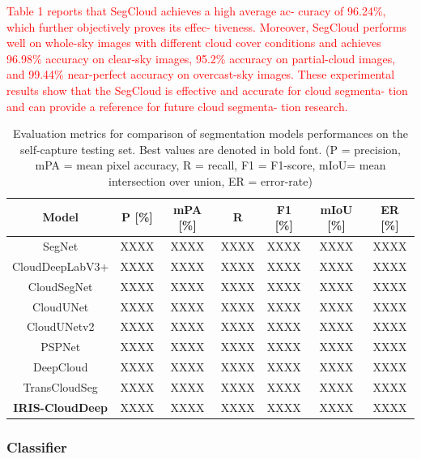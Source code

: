 \documentclass[amt, article]{copernicus}
\begin{document}
\textcolor{red}{Table 1 reports that SegCloud achieves a high average ac-
curacy of 96.24\%, which further objectively proves its effec-
tiveness. Moreover, SegCloud performs well on whole-sky
images with different cloud cover conditions and achieves
96.98\% accuracy on clear-sky images, 95.2\% accuracy on
partial-cloud images, and 99.44\% near-perfect accuracy on overcast-sky images. These experimental results show that
the SegCloud is effective and accurate for cloud segmenta-
tion and can provide a reference for future cloud segmenta-
tion research.}

\begin{table}[t]
\begin{center}
    \caption{Evaluation metrics for comparison of segmentation models performances on the self-capture testing set. Best values are denoted in bold font. (P = precision, mPA = mean pixel accuracy, R = recall, F1 = F1-score, mIoU= mean intersection over union, ER = error-rate)}
    \begin{tabular}{c c c c c c c} 
    \tophline \hline
     Model & P [\%] & mPA [\%] & R & F1 [\%] & mIoU [\%] & ER [\%] \\ [1.0ex]
     \hline
     SegNet & XXXX & XXXX & XXXX & XXXX & XXXX & XXXX \\ [1.0ex]
     CloudDeepLabV3+ & XXXX & XXXX & XXXX & XXXX & XXXX & XXXX \\ [1.0ex]
     CloudSegNet & XXXX & XXXX & XXXX & XXXX & XXXX & XXXX \\ [1.0ex]
     CloudUNet & XXXX & XXXX & XXXX & XXXX & XXXX & XXXX \\ [1.0ex]
     CloudUNetv2 & XXXX & XXXX & XXXX & XXXX & XXXX & XXXX \\ [1.0ex]
     PSPNet & XXXX & XXXX & XXXX & XXXX & XXXX & XXXX \\ [1.0ex]
     DeepCloud & XXXX & XXXX & XXXX & XXXX & XXXX & XXXX \\ [1.0ex]
     TransCloudSeg & XXXX & XXXX & XXXX & XXXX & XXXX & XXXX \\ [1.0ex]
     \textbf{IRIS-CloudDeep} & XXXX & XXXX & XXXX & XXXX & XXXX & XXXX \\
     \hline
    \end{tabular}
    \belowtable{}
    \end{center}
\end{table}

\subsubsection{Classifier}
\end{document}
